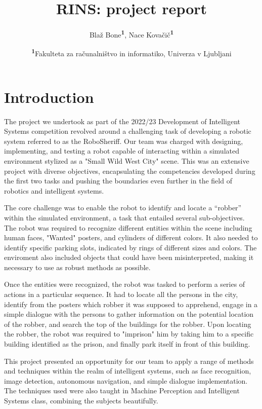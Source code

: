 \documentclass{article}
\begin{document}
\title{RINS: project report}
\author{
	Blaž Bone\textsuperscript{\textbf{1}},
    Nace Kovačič\textsuperscript{\textbf{1}}
 }

\date{\footnotesize\textsuperscript{\textbf{1}}Fakulteta za računalništvo in informatiko, Univerza v Ljubljani}


\maketitle

\section{Introduction}

The project we undertook as part of the 2022/23 Development of Intelligent Systems competition revolved around a challenging task of developing a robotic system referred to as the RoboSheriff. Our team was charged with designing, implementing, and testing a robot capable of interacting within a simulated environment stylized as a "Small Wild West City" scene. This was an extensive project with diverse objectives, encapsulating the competencies developed during the first two tasks and pushing the boundaries even further in the field of robotics and intelligent systems.

The core challenge was to enable the robot to identify and locate a “robber” within the simulated environment, a task that entailed several sub-objectives. The robot was required to recognize different entities within the scene including human faces, "Wanted" posters, and cylinders of different colors. It also needed to identify specific parking slots, indicated by rings of different sizes and colors. The enviroment also included objects that could have been misinterpreted, making it necessary to use as robust methods as possible.

Once the entities were recognized, the robot was tasked to perform a series of actions in a particular sequence. It had to locate all the persons in the city, identify from the posters which robber it was supposed to apprehend, engage in a simple dialogue with the persons to gather information on the potential location of the robber, and search the top of the buildings for the robber. Upon locating the robber, the robot was required to "imprison" him by taking him to a specific building identified as the prison, and finally park itself in front of this building.

This project presented an opportunity for our team to apply a range of methods and techniques within the realm of intelligent systems, such as face recognition, image detection, autonomous navigation, and simple dialogue implementation. The techniques used were also taught in Machine Perception and Intelligent Systems class, combining the subjects beautifully. 
\end{document}

